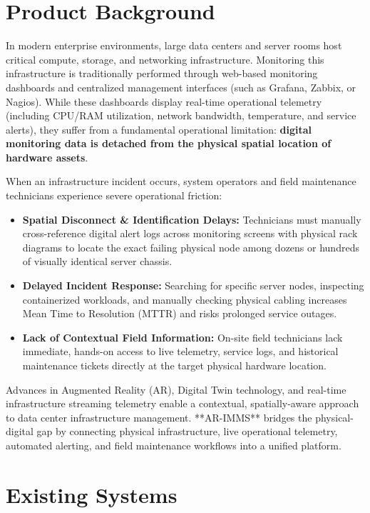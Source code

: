 \section{Product Background}
In modern enterprise environments, large data centers and server rooms host critical compute, storage, and networking infrastructure. Monitoring this infrastructure is traditionally performed through web-based monitoring dashboards and centralized management interfaces (such as Grafana, Zabbix, or Nagios). While these dashboards display real-time operational telemetry (including CPU/RAM utilization, network bandwidth, temperature, and service alerts), they suffer from a fundamental operational limitation: \textbf{digital monitoring data is detached from the physical spatial location of hardware assets}.

When an infrastructure incident occurs, system operators and field maintenance technicians experience severe operational friction:
\begin{itemize}
    \item \textbf{Spatial Disconnect \& Identification Delays:} Technicians must manually cross-reference digital alert logs across monitoring screens with physical rack diagrams to locate the exact failing physical node among dozens or hundreds of visually identical server chassis.
    \item \textbf{Delayed Incident Response:} Searching for specific server nodes, inspecting containerized workloads, and manually checking physical cabling increases Mean Time to Resolution (MTTR) and risks prolonged service outages.
    \item \textbf{Lack of Contextual Field Information:} On-site field technicians lack immediate, hands-on access to live telemetry, service logs, and historical maintenance tickets directly at the target physical hardware location.
\end{itemize}

Advances in Augmented Reality (AR), Digital Twin technology, and real-time infrastructure streaming telemetry enable a contextual, spatially-aware approach to data center infrastructure management. **AR-IMMS** bridges the physical-digital gap by connecting physical infrastructure, live operational telemetry, automated alerting, and field maintenance workflows into a unified platform.

\section{Existing Systems}

